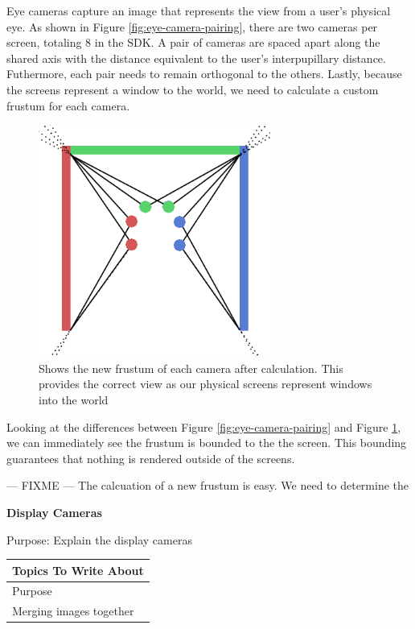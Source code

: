 Eye cameras capture an image that represents the view from a user's physical eye. As shown in Figure \ref{fig:eye-camera-pairing}, there are two cameras per screen, totaling 8 in the SDK. A pair of cameras are spaced apart along the shared axis with the distance equivalent to the user's interpupillary distance. Futhermore, each pair needs to remain orthogonal to the others. Lastly, because the screens represent a window to the world, we need to calculate a custom frustum for each camera.

\begin{figure}[H]
	\centering
	\includegraphics[width=3in]{images/camera-pairs-calibrated}
	\caption[The New Frustum of Eye Cameras]{Shows the new frustum of each camera after calculation. This provides the correct view as our physical screens represent windows into the world}
	\label{fig:eye-camera-frustum}
\end{figure}

Looking at the differences between Figure \ref{fig:eye-camera-pairing} and Figure \ref{fig:eye-camera-frustum}, we can immediately see the frustum is bounded to the the screen. This bounding guarantees that nothing is rendered outside of the screens. 

--- FIXME ---
The calcuation of a new frustum is easy. We need to determine the

\filbreak
\noindent\textbf{Display Cameras} \\
\begin{center}
	\textcolor{OliveGreen} {
		Purpose: Explain the display cameras
	}
	
	\begin{table}[H]
		\centering
		\renewcommand\arraystretch{0.5}
		\begin{tabular}{|l|}
			\hline 
			Topics To Write About \\ 
			\hline 
			Purpose \\
			Merging images together \\
			\hline 
		\end{tabular}
	\end{table}
\end{center}

